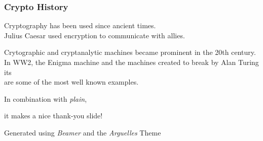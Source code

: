 \documentclass{beamer}
\begin{document}

  \begin{frame}
    \frametitle{Crypto History}

    Cryptography has been used since ancient times. \\
    Julius Caesar used encryption to communicate with allies.

    \vfill

    Crytographic and cryptanalytic machines became prominent in the 20th century. \\
    In WW2, the Enigma machine and the machines created to break by Alan Turing its \\
    are some of the most well known examples.

  \end{frame}

   
  \ThankYou
  \begin{frame}
    In combination with \textit{plain},\par
    it makes a nice thank-you slide!

    \vfill{Generated using \textit{Beamer} and the \textit{Arguelles} Theme}
  \end{frame}
\end{document}
